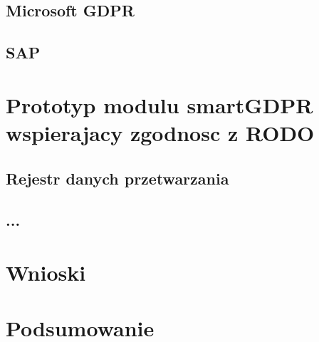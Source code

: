 \documentclass[en, noamssymb]{mgr}
\begin{document}
\section{Microsoft GDPR}
\section{SAP}

\chapter{Prototyp modulu smartGDPR wspierajacy zgodnosc z RODO} \label{sec:sekcjaOpisPrototypu}
\section{Rejestr danych przetwarzania}
\section{...}

\chapter{Wnioski} \label{sec:sekcjaWnioski}

\chapter{Podsumowanie}
\label{sec:Podsumowanie}

\end{document}

